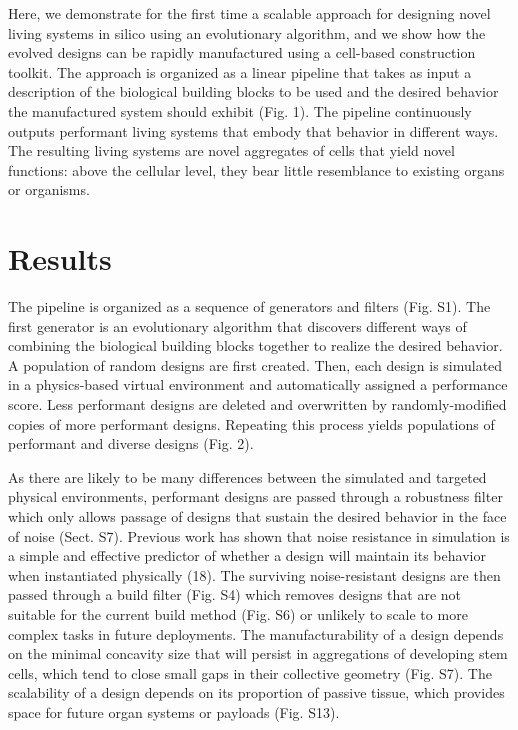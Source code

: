 Here, we demonstrate for the first time a scalable approach for designing novel living systems in silico using an evolutionary algorithm, and we show how the evolved designs can be rapidly manufactured using a cell-based construction toolkit. The approach is organized as a linear pipeline that takes as input a description of the biological building blocks to be used and the desired behavior the manufactured system should exhibit (Fig. 1). The pipeline continuously outputs performant living systems that embody that behavior in different ways. The resulting living systems are novel aggregates of cells that yield novel functions: above the cellular level, they bear little resemblance to existing organs or organisms.

\section{Results}

The pipeline is organized as a sequence of generators and filters (Fig. S1). The first generator is an evolutionary algorithm that discovers different ways of combining the biological building blocks together to realize the desired behavior. A population of random designs are first created. Then, each design is simulated in a physics-based virtual environment and automatically assigned a performance score. Less performant designs are deleted and overwritten by randomly-modified copies of more performant designs. Repeating this process yields populations of performant and diverse designs (Fig. 2).

As there are likely to be many differences between the simulated and targeted physical environments, performant designs are passed through a robustness filter which only allows passage of designs that sustain the desired behavior in the face of noise (Sect. S7). Previous work has shown that noise resistance in simulation is a simple and effective predictor of whether a design will maintain its behavior when instantiated physically (18). 
The surviving noise-resistant designs are then passed through a build filter (Fig. S4) which removes designs that are not suitable for the current build method (Fig. S6) or unlikely to scale to more complex tasks in future deployments. The manufacturability of a design depends on the minimal concavity size that will persist in aggregations of developing stem cells, which tend to close small gaps in their collective geometry (Fig. S7). The scalability of a design depends on its proportion of passive tissue, which provides space for future organ systems or payloads (Fig. S13).

